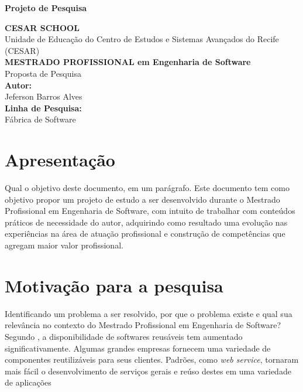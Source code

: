 \documentclass[10pt,a4paper]{article}
\begin{document}
\begin{titlepage}
\begin{center}{\bf \Large Projeto de Pesquisa}\\[3.5cm]
\end{center}
\begin{flushright}
{\bf CESAR SCHOOL}\\
{Unidade de Educação do Centro de Estudos e Sistemas Avançados do Recife}
{(CESAR)}\\[3.5cm]
{\bf \large MESTRADO PROFISSIONAL em Engenharia de Software}\\
{Proposta de Pesquisa}\\[2.5cm] 
{\bf Autor:}\\
{Jeferson Barros Alves}\\[0.8cm]
{\bf Linha de Pesquisa:}\\
{Fábrica de Software}\\[0.8cm]
\end{flushright}
\end{titlepage}
 

\tableofcontents
{}
\newpage

\section{Apresentação}
Qual o objetivo deste documento, em um parágrafo.
Este documento tem como objetivo propor um projeto de estudo a ser desenvolvido durante o Mestrado Profissional em Engenharia de Software, com intuito de trabalhar com conteúdos práticos de necessidade do autor, adquirindo como resultado uma evolução nas experiências na área de atuação profissional e construção de competências que agregam maior valor profissional.

\section{Motivação para a pesquisa}
Identificando um problema a ser resolvido, \cite{Mazo2012} por que o problema existe e qual sua relevância
no contexto do Mestrado Profissional em Engenharia de Software?
Segundo \cite{Sommerville2011}, a disponibilidade de softwares reusáveis tem aumentado significativamente. Algumas grandes empresas fornecem uma variedade de componentes reutilizáveis para seus clientes. Padrões, como \textit{web service}, tornaram mais fácil o desenvolvimento de serviços gerais e reúso destes em uma variedade de aplicações
\end{document}
